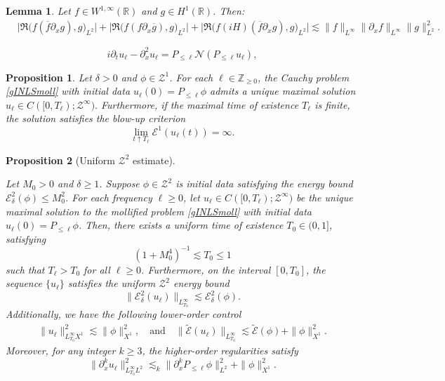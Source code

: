 \documentclass[10pt,a4paper]{amsart}
\newtheorem{lemma}{Lemma}
\newtheorem{proposition}{Proposition}
\newcommand{\R}{\mathbb{R}}
\newcommand{\Z}{\mathbb{Z}}
\begin{document}
\begin{lemma}\label{lem:ibp}
Let $f\in W^{1,\infty}(\R)$ and $g\in H^1(\R)$. Then:
\begin{align*}
&\big| \Re \big( f(\overline{f}\partial_xg),g \big)_{L^2} \big| + \big| \Re \big( f(f\partial_x\overline{g}),g\big)_{L^2} \big| + \big| \Re \big( f(iH)(\overline{f}\partial_xg),g\big)_{L^2} \big| \lesssim \| f\|_{L^\infty}\| \partial_xf\|_{L^\infty}\| g\|_{L^2}^2.
\end{align*}
\end{lemma}

\begin{equation}\label{gINLSmoll}
i\partial_t u_\ell - \partial_x^2 u_\ell = P_{\leq \ell}\mathcal{N}(P_{\leq \ell}u_\ell),
\end{equation}

\begin{proposition}\label{prop:LWPmoll}
Let {$\delta>0$ and} $\phi\in \mathcal{Z}^1$. 
 For each $\ell \in \Z_{\geq 0}$, the Cauchy problem \eqref{gINLSmoll} with initial data $u_\ell(0) = P_{\leq \ell}\phi$ admits a unique maximal solution $ u_\ell \in C([0,T_\ell); \mathcal{Z}^\infty). $ Furthermore, if the maximal time of existence $T_\ell$ is finite, the solution satisfies the blow-up criterion
 $$ \lim_{t\uparrow T_\ell} \mathcal{E}^1(u_\ell(t)) = \infty. $$
\end{proposition}

\begin{proposition}[Uniform $\mathcal{Z}^2$ estimate]\label{prop:apriori-Zk}

Let $M_0>0$ and $\delta\geq 1$. Suppose $\phi \in \mathcal{Z}^2$ is initial data satisfying the energy bound $\mathcal{E}^2_\delta(\phi)\leq M_0^2$. For each frequency $\ell \geq 0$, let $u_\ell \in C([0,T_\ell); \mathcal{Z}^\infty)$ be the unique maximal solution to the mollified problem \eqref{gINLSmoll} with initial data $u_\ell(0)=P_{\leq \ell}\phi$. Then, there exists a uniform time of existence $T_0 \in (0, 1]$, satisfying 
$$
    (1+M_0^4)^{-1} \lesssim T_0 \leq 1
$$
such that $T_\ell > T_0$ for all $\ell \geq 0$. Furthermore, on the interval $[0, T_0]$, the sequence $\{u_\ell\}$ satisfies the uniform $\mathcal{Z}^2$ energy bound
\begin{equation}\label{est:aprioriZ2}
\| \mathcal{E}^2_\delta(u_\ell) \|_{L^\infty_{T_0}} \lesssim \mathcal{E}^2_\delta(\phi).
\end{equation}
Additionally, we have the following lower-order control
\begin{align}\label{est:aprioriZ2'}
\| u_\ell \|_{L^\infty_{T_0}X^1}^2 \lesssim \| \phi \|_{X^1}^2, 
\quad \text{and}\quad
\| \widetilde{\mathcal{E}}(u_\ell) \|_{L^\infty_{T_0}} \lesssim \widetilde{\mathcal{E}}(\phi) + \| \phi \|_{X^1}^2. 
\end{align}
Moreover, for any integer $k \geq 3$, the higher-order regularities satisfy
\begin{equation}\label{est:aprioriZk}
\| \partial_x^k u_\ell \|_{L^\infty_{T_0}L^2}^2 \lesssim_k \| \partial_x^k P_{\leq \ell}\phi \|_{L^2}^2 + \| \phi \|_{X^1}^2.
\end{equation}
\end{proposition}
\end{document}
